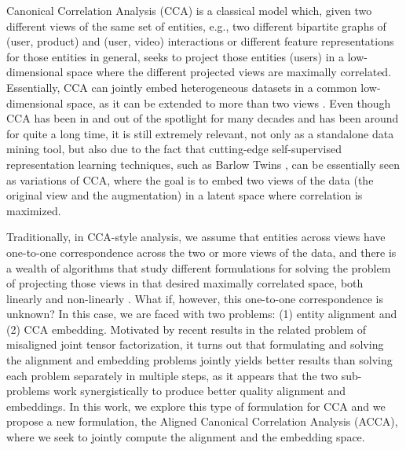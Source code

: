 Canonical Correlation Analysis (CCA) \cite{harold1936relations,kettenring1971canonical} is a classical model which, given two different views of the same set of entities, e.g., two different bipartite graphs of (user, product) and (user, video) interactions or different feature representations for those entities in general, seeks to project those entities (users) in a low-dimensional space where the different projected views are maximally correlated. Essentially, CCA can jointly embed heterogeneous datasets in a common low-dimensional space, as it can be extended to more than two views \cite{chen2019graph,chen2022unsupervised}. Even though CCA has been in and out of the spotlight for many decades and has been around for quite a long time, it is still extremely relevant, not only as a standalone data mining tool, but also due to the fact that cutting-edge self-supervised representation learning techniques, such as Barlow Twins \cite{zbontar2021barlow,bielak2022graph,zhang2021canonical,balestriero2023cookbook}, can be essentially seen as variations of CCA, where the goal is to embed two views of the data (the original view and the augmentation) in a latent space where correlation is maximized.

Traditionally, in CCA-style analysis, we assume that entities across views have one-to-one correspondence across the two or more views of the data, and there is a wealth of algorithms that study different formulations for solving the problem of projecting those views in that desired maximally correlated space, both linearly and non-linearly \cite{andrew2013deep}. What if, however, this one-to-one correspondence is unknown? In this case, we are faced with two problems: (1) entity alignment and (2) CCA embedding. Motivated by recent results \cite{wu2022tenalign} in the related problem of misaligned joint tensor factorization, it turns out that formulating and solving the alignment and embedding problems jointly yields better results than solving each problem separately in multiple steps, as it appears that the two sub-problems work synergistically to produce better quality alignment and embeddings. In this work, we explore this type of formulation for CCA and we propose a new formulation, the Aligned Canonical Correlation Analysis (ACCA), where we seek to jointly compute the alignment and the embedding space.

